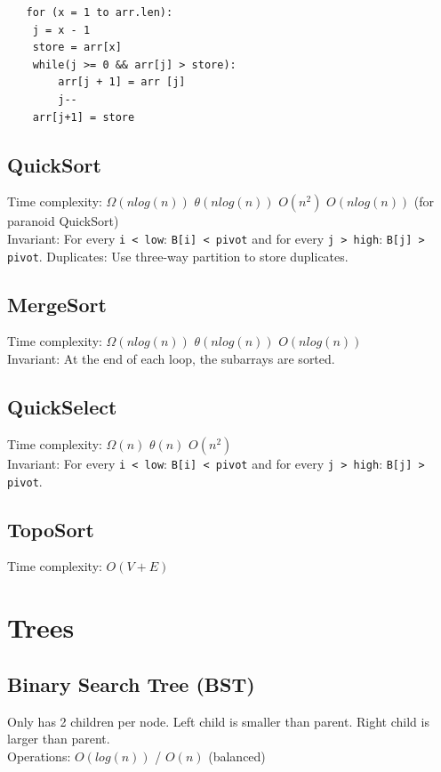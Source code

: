 \documentclass[10pt,landscape,a4paper]{article}
\begin{document}
\begin{multicols*}{4}
\begin{lstlisting}
   for (x = 1 to arr.len):
	j = x - 1
	store = arr[x]
	while(j >= 0 && arr[j] > store):
		arr[j + 1] = arr [j]
		j--
	arr[j+1] = store
\end{lstlisting}

\subsection{QuickSort}
Time complexity: $\Omega({nlog(n)})$ $\theta(nlog(n))$ $O(n^2)$ $O(nlog(n))$ (for paranoid QuickSort)  \\
Invariant: For every \texttt{i < low}: \texttt{B[i] < pivot} and for every \texttt{j > high}: \texttt{B[j] > pivot}.
Duplicates: Use three-way partition to store duplicates.

\subsection{MergeSort}
Time complexity: $\Omega({nlog(n)})$ $\theta(nlog(n))$ $O(nlog(n))$ \\
Invariant: At the end of each loop, the subarrays are sorted.

\subsection{QuickSelect}
Time complexity: $\Omega(n)$ $\theta(n)$ $O(n^2)$ \\ 
Invariant: For every \texttt{i < low}: \texttt{B[i] < pivot} and for every \texttt{j > high}: \texttt{B[j] > pivot}.


\subsection{TopoSort}
Time complexity: $O(V+E)$


\section{Trees}

\subsection{Binary Search Tree (BST)}
Only has 2 children per node. Left child is smaller than parent. Right child is larger than parent. \\
Operations: $O(log(n))$ / $O(n)$ (balanced)


\end{multicols*}
\end{document}
